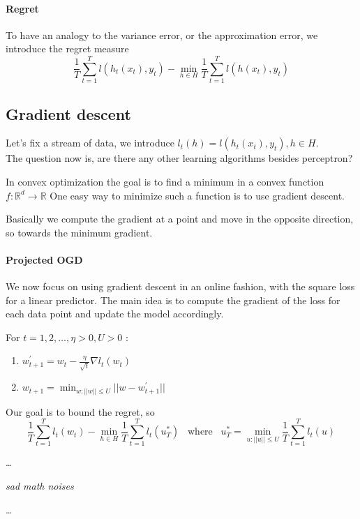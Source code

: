 \paragraph{Regret}
To have an analogy to the variance error, or the approximation error, 
we introduce the regret measure
$$\frac{1}{T}\sum_{t=1}^T l(h_t(x_t), y_t) - \min_{h\in H}\frac{1}{T}\sum_{t=1}^T l(h(x_t), y_t)$$

\subsection{Gradient descent}
Let's fix a stream of data, we introduce $l_t(h) = l(h_t(x_t), y_t), h\in H$.\\
The question now is, are there any other learning algorithms 
besides perceptron?

In convex optimization the goal is to find a minimum in a convex 
function $f : \mathbb{R}^d \rightarrow \mathbb{R}$
One easy way to minimize such a function is to use gradient descent.

Basically we compute the gradient at a point and move in the opposite direction, 
so towards the minimum gradient.

\paragraph{Projected OGD}
We now focus on using gradient descent in an online fashion, 
with the square loss for a linear predictor.
The main idea is to compute the gradient of the loss 
for each data point and update the model accordingly.

For $t = 1, 2, \dots, \eta > 0, U > 0$ :
\begin{enumerate}
    \item $w^\prime_{t+1} = w_t - \frac{\eta}{\sqrt{t}}\nabla l_t(w_t)$
    \item $w_{t+1} = \min_{w : ||w||\leq U} ||w- w^\prime_{t+1} || $
\end{enumerate}
Our goal is to bound the regret, so 
$$\frac{1}{T}\sum_{t=1}^T l_t(w_t) - \min_{h\in H}\frac{1}{T}\sum_{t=1}^T l_t(u^*_T)\;\;\;
\text{where}\;\;\;
u^*_T = \min_{u : ||u|| \leq U}\frac{1}{T}\sum_{t=1}^T l_t(u)$$

\dots

\emph{sad math noises}

\dots